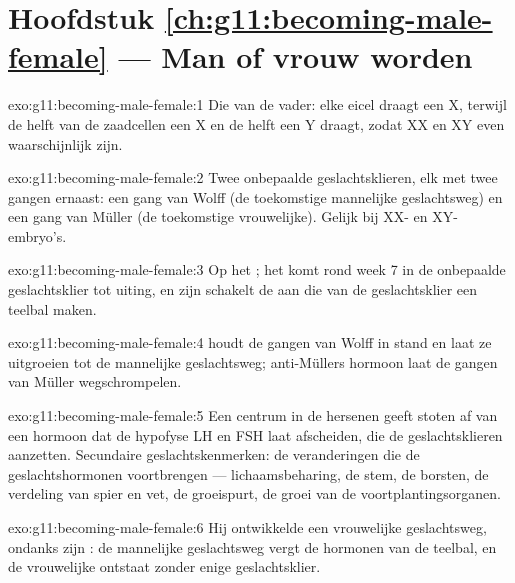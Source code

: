 \section*{Hoofdstuk \ref{ch:g11:becoming-male-female} --- Man of vrouw worden}

\begin{solution}{exo:g11:becoming-male-female:1}
Die van de vader: elke eicel draagt een X, terwijl de helft van de
zaadcellen een X en de helft een Y draagt, zodat XX en XY even
waarschijnlijk zijn.
\end{solution}

\begin{solution}{exo:g11:becoming-male-female:2}
Twee onbepaalde geslachtsklieren, elk met twee gangen ernaast: een gang
van Wolff (de toekomstige mannelijke geslachtsweg) en een gang van Müller
(de toekomstige vrouwelijke). Gelijk bij XX- en XY-embryo's.
\end{solution}

\begin{solution}{exo:g11:becoming-male-female:3}
Op het ; het komt rond week 7 in de onbepaalde
geslachtsklier tot uiting, en zijn  schakelt de  aan die van de
geslachtsklier een teelbal maken.
\end{solution}

\begin{solution}{exo:g11:becoming-male-female:4}
 houdt de gangen van Wolff in stand en laat ze uitgroeien tot
de mannelijke geslachtsweg; anti-Müllers hormoon laat de gangen van
Müller wegschrompelen.
\end{solution}

\begin{solution}{exo:g11:becoming-male-female:5}
Een centrum in de hersenen geeft stoten af van een hormoon dat de
hypofyse LH en FSH laat afscheiden, die de geslachtsklieren aanzetten.
Secundaire geslachtskenmerken: de veranderingen die de geslachtshormonen
voortbrengen --- lichaamsbeharing, de stem, de borsten, de verdeling van
spier en vet, de groeispurt, de groei van de voortplantingsorganen.
\end{solution}

\begin{solution}{exo:g11:becoming-male-female:6}
Hij ontwikkelde een vrouwelijke geslachtsweg, ondanks zijn :
de mannelijke geslachtsweg vergt de hormonen van de teelbal, en de
vrouwelijke ontstaat zonder enige geslachtsklier.
\end{solution}

